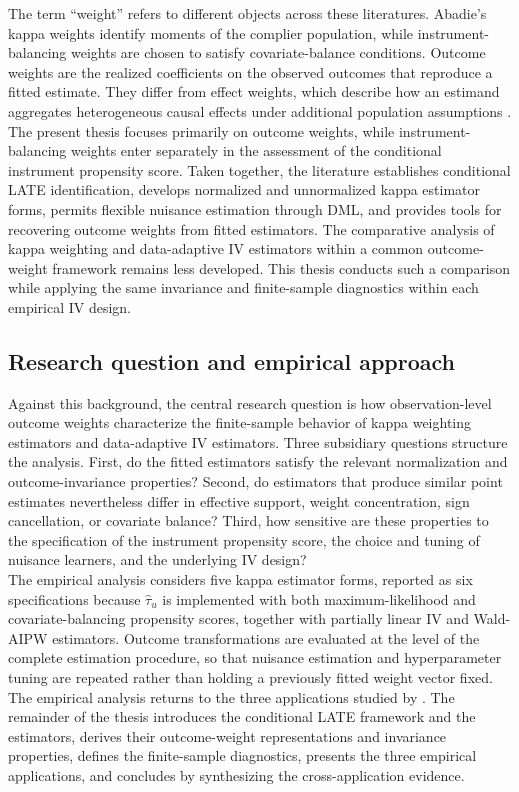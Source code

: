 \documentclass[12pt, a4paper, oneside]{article}
\theoremstyle{plain}
\theoremstyle{definition}
\begin{document}
The term ``weight'' refers to different objects across these literatures. Abadie's kappa weights identify moments of the complier population, while instrument-balancing weights are chosen to satisfy covariate-balance conditions. Outcome weights are the realized coefficients on the observed outcomes that reproduce a fitted estimate. They differ from effect weights, which describe how an estimand aggregates heterogeneous causal effects under additional population assumptions \citep{knaus2024treatment}. The present thesis focuses primarily on outcome weights, while instrument-balancing weights enter separately in the assessment of the conditional instrument propensity score.
Taken together, the literature establishes conditional LATE identification, develops normalized and unnormalized kappa estimator forms, permits flexible nuisance estimation through DML, and provides tools for recovering outcome weights from fitted estimators. The comparative analysis of kappa weighting and data-adaptive IV estimators within a common outcome-weight framework remains less developed. This thesis conducts such a comparison while applying the same invariance and finite-sample diagnostics within each empirical IV design.




\subsection{Research question and empirical approach}

Against this background, the central research question is how observation-level outcome weights characterize the finite-sample behavior of kappa weighting estimators and data-adaptive IV estimators. Three subsidiary questions structure the analysis. First, do the fitted estimators satisfy the relevant normalization and outcome-invariance properties? Second, do estimators that produce similar point estimates nevertheless differ in effective support, weight concentration, sign cancellation, or covariate balance? Third, how sensitive are these properties to the specification of the instrument propensity score, the choice and tuning of nuisance learners, and the underlying IV design?\\
The empirical analysis considers five kappa estimator forms, reported as six specifications because $\widehat\tau_u$ is implemented with both maximum-likelihood and covariate-balancing propensity scores, together with partially linear IV and Wald-AIPW estimators. Outcome transformations are evaluated at the level of the complete estimation procedure, so that nuisance estimation and hyperparameter tuning are repeated rather than holding a previously fitted weight vector fixed. 
The empirical analysis returns to the three applications studied by
\citet{sloczynski2025abadie}. 
The remainder of the thesis introduces the conditional LATE framework and the estimators, derives their outcome-weight representations and invariance properties, defines the finite-sample diagnostics, presents the three empirical applications, and concludes by synthesizing the cross-application evidence.
\end{document}
